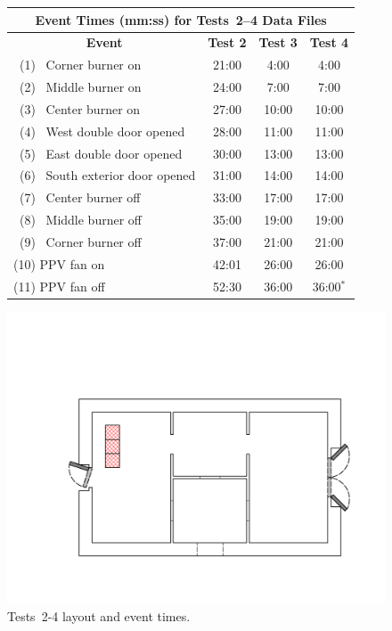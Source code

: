 \documentclass[12pt,oneside]{book}
\begin{document}
\begin{figure}[!ht]
\begin{minipage}[b]{0.8\columnwidth}
	\begin{flushleft}
	\small
	\begin{tabular}{lccc}
	\multicolumn{4}{c}{\normalsize Event Times (mm:ss) for Tests~2--4 Data Files} \\
	\toprule
	\multicolumn{1}{c}{\textbf{Event}} & \textbf{Test 2} & \textbf{Test 3} & \textbf{Test 4} \\
	\midrule
	~(1)~ Corner burner on 				& 	21:00		  &		4:00		&		4:00	  \\
	~(2)~ Middle burner on 				&   24:00		  &		7:00		&		7:00	  \\
	~(3)~ Center burner on 				&   27:00		  &	   10:00		&	   10:00	  \\
	~(4)~ West double door opened 		&   28:00		  &    11:00		&	   11:00	  \\
	~(5)~ East double door opened 		&   30:00		  &    13:00		&	   13:00	  \\
	~(6)~ South exterior door opened 	&   31:00		  &    14:00		&	   14:00	  \\
	~(7)~ Center burner off				&   33:00		  &    17:00		&	   17:00	  \\
	~(8)~ Middle burner off				&   35:00		  &    19:00		&	   19:00	  \\
	~(9)~ Corner burner off				&   37:00		  &    21:00		&	   21:00	  \\
	(10) PPV fan on 					& 	42:01		  &    26:00		&  	   26:00	  \\	
	(11) PPV fan off 					& 	52:30 		  &    36:00  		&  	   36:00$^*$  \\
	\bottomrule
	\end{tabular}
	\end{flushleft}
\end{minipage}
\begin{minipage}[b]{0.9\columnwidth}
	\vspace{15pt}
	\centering
	\includegraphics[width=\columnwidth]{../Figures/Floor_Plans/East_Structure_Test_4}
\end{minipage}
\caption{Tests~2-4 layout and event times.}
\label{fig:Tests_2-4_layout}
\end{figure}
\end{document}
